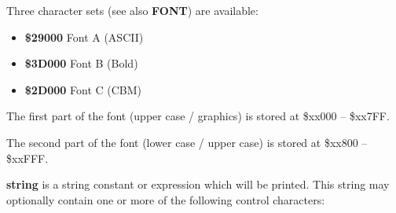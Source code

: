 \begin{description}[leftmargin=2cm,style=nextline]
                Three character sets (see also {\bf FONT}) are available:
                \begin{itemize}
                    \item {\bf \$29000} Font A (ASCII)
                    \item {\bf \$3D000} Font B (Bold)
                    \item {\bf \$2D000} Font C (CBM)
                \end{itemize}

                The first part of the font (upper case / graphics)
                is stored at \$xx000 -- \$xx7FF.

                The second part of the font (lower case / upper case)
                is stored at \$xx800 -- \$xxFFF.

                {\bf string} is a string constant or expression
                which will be printed. This string may optionally contain
                one or more of the following control characters:


\end{description}
